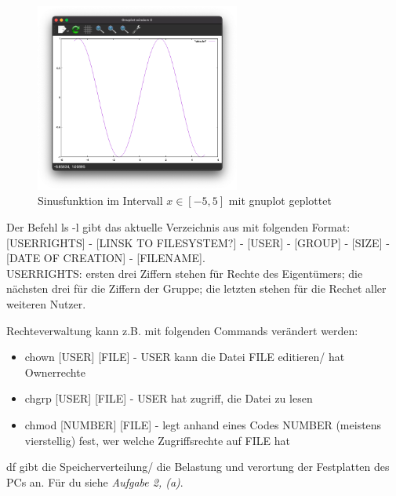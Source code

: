 \documentclass{scrartcl}
\begin{document}
         \begin{figure}[H]
            \centering
            \includegraphics[width=0.6\textwidth]{Bilder/Bildschirmfoto 2023-04-26 um 22.51.30.png}
            \caption{Sinusfunktion im Intervall $x\in[-5,5]$ mit gnuplot geplottet}
            \label{fig:gnuplotSinefunction}
        \end{figure}
        
    \subaufgabe{}
        Der Befehl ls -l gibt das aktuelle Verzeichnis aus mit folgenden Format: [USERRIGHTS] - [LINSK TO FILESYSTEM?] - [USER] - [GROUP] - [SIZE] - [DATE OF CREATION] - [FILENAME].\\

        \noindent USERRIGHTS: ersten drei Ziffern stehen für Rechte des Eigentümers; die nächsten drei für die Ziffern der Gruppe; die letzten stehen für die Rechet aller weiteren Nutzer.

        \noindent Rechteverwaltung kann z.B. mit folgenden Commands verändert werden:
        \begin{itemize}
            \item chown [USER] [FILE] - USER kann die Datei FILE editieren/ hat Ownerrechte
            \item chgrp [USER] [FILE] - USER hat zugriff, die Datei zu lesen
            \item chmod [NUMBER] [FILE] - legt anhand eines Codes NUMBER (meistens vierstellig) fest, wer welche Zugriffsrechte auf FILE hat
        \end{itemize}

    \subaufgabe{}
        df gibt die Speicherverteilung/ die Belastung und verortung der Festplatten des PCs an. Für du siehe \textit{Aufgabe 2, (a)}.
        
\end{document}
